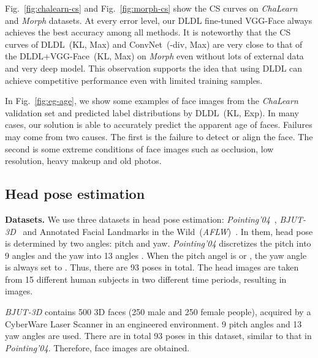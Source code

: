 \documentclass[journal]{IEEEtran}
\begin{document}
Fig.~\ref{fig:chalearn-cs} and Fig.~\ref{fig:morph-cs} show the CS curves on \emph{ChaLearn} and \emph{Morph} datasets. At every error level, our DLDL fine-tuned VGG-Face always achieves the best accuracy among all methods. It is noteworthy that the CS curves of DLDL~(KL, Max) and ConvNet~(-div, Max) are very close to that of the DLDL+VGG-Face~(KL, Max) on \emph{Morph} even without lots of external data and very deep model. This observation supports the idea that using DLDL can achieve competitive performance even with limited training samples.

In Fig.~\ref{fig:eg-age}, we show some examples of face images from the \emph{ChaLearn} validation set and predicted label distributions by DLDL~(KL, Exp). In many cases, our solution is able to accurately predict the apparent age of faces. Failures may come from two causes. The first is the failure to detect or align the face. The second is some extreme conditions of face images such as occlusion, low resolution, heavy makeup and old photos.

\subsection{Head pose estimation}
\textbf{Datasets.} We use three datasets in head pose estimation: \emph{Pointing'04}~\cite{gourier2004estimating}, \emph{BJUT-3D}~\cite{baocai2009bjut} and Annotated Facial Landmarks in the Wild~(\emph{AFLW})~\cite{tugraz:icg:lrs}. In them, head pose is determined by two angles: pitch and yaw. \emph{Pointing'04} discretizes the pitch into 9 angles  and the yaw into 13 angles . When the pitch angel is  or , the yaw angle is always set to . Thus, there are 93 poses in total. The head images are taken from 15 different human subjects in two different time periods, resulting in  images.

\emph{BJUT-3D} contains 500 3D faces (250 male and 250 female people), acquired by a CyberWare Laser Scanner in an engineered environment. 9 pitch angles  and 13 yaw angles  are used. There are in total 93 poses in this dataset, similar to that in \emph{Pointing'04}. Therefore,  face images are obtained.
\end{document}
